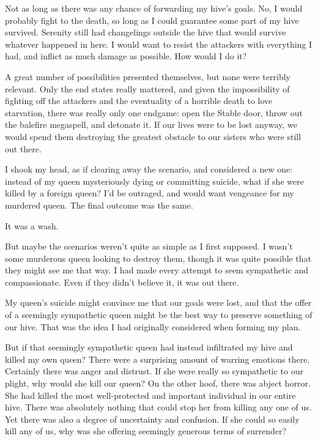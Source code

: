Not as long as there was any chance of forwarding my hive’s goals. No, I would probably fight to the death, so long as I could guarantee some part of my hive survived. Serenity still had changelings outside the hive that would survive whatever happened in here. I would want to resist the attackers with everything I had, and inflict as much damage as possible. How would I do it?

A great number of possibilities presented themselves, but none were terribly relevant. Only the end states really mattered, and given the impossibility of fighting off the attackers and the eventuality of a horrible death to love starvation, there was really only one endgame: open the Stable door, throw out the balefire megaspell, and detonate it. If our lives were to be lost anyway, we would spend them destroying the greatest obstacle to our sisters who were still out there.

I shook my head, as if clearing away the scenario, and considered a new one: instead of my queen mysteriously dying or committing suicide, what if she were killed by a foreign queen? I’d be outraged, and would want vengeance for my murdered queen. The final outcome was the same.

It was a wash.

But maybe the scenarios weren’t quite as simple as I first supposed. I wasn’t some murderous queen looking to destroy them, though it was quite possible that they might see me that way. I had made every attempt to seem sympathetic and compassionate. Even if they didn’t believe it, it was out there.

My queen’s suicide might convince me that our goals were lost, and that the offer of a seemingly sympathetic queen might be the best way to preserve something of our hive. That was the idea I had originally considered when forming my plan.

But if that seemingly sympathetic queen had instead infiltrated my hive and killed my own queen? There were a surprising amount of warring emotions there. Certainly there was anger and distrust. If she were really so sympathetic to our plight, why would she kill our queen? On the other hoof, there was abject horror. She had killed the most well-protected and important individual in our entire hive. There was absolutely nothing that could stop her from killing any one of us. Yet there was also a degree of uncertainty and confusion. If she could so easily kill any of us, why was she offering seemingly generous terms of surrender?

